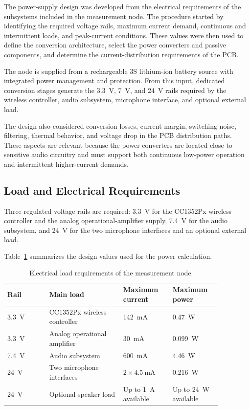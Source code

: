The power-supply design was developed from the electrical requirements of the subsystems included in the measurement node. The procedure started by identifying the required voltage rails, maximum current demand, continuous and intermittent loads, and peak-current conditions. These values were then used to define the conversion architecture, select the power converters and passive components, and determine the current-distribution requirements of the PCB.

The node is supplied from a rechargeable 3S lithium-ion battery source with integrated power management and protection. From this input, dedicated conversion stages generate the 3.3~V, 7~V, and 24~V rails required by the wireless controller, audio subsystem, microphone interface, and optional external load.

The design also considered conversion losses, current margin, switching noise, filtering, thermal behavior, and voltage drop in the PCB distribution paths. These aspects are relevant because the power converters are located close to sensitive audio circuitry and must support both continuous low-power operation and intermittent higher-current demands.


\subsection{Load and Electrical Requirements}

Three regulated voltage rails are required: 3.3~V for the CC1352Px wireless controller and the analog operational-amplifier supply, 7.4~V for the audio subsystem, and 24~V for the two microphone interfaces and an optional external load.

Table~\ref{tab:power_load_requirements} summarizes the design values used for the power calculation.

\begin{table}[h]
\centering
\caption{Electrical load requirements of the measurement node.}
\label{tab:power_load_requirements}
\begin{tabular}{|p{0.17\linewidth}|p{0.30\linewidth}|p{0.20\linewidth}|p{0.20\linewidth}|}
\hline
\textbf{Rail} & \textbf{Main load} & \textbf{Maximum current} & \textbf{Maximum power} \\
\hline
3.3~V & CC1352Px wireless controller & 142~mA & 0.47~W \\
\hline
3.3~V & Analog operational amplifier & 30~mA & 0.099~W \\
\hline
7.4~V & Audio subsystem & 600~mA & 4.46~W \\
\hline
24~V & Two microphone interfaces & $2\times4.5~\mathrm{mA}$ & 0.216~W \\
\hline
24~V & Optional speaker load & Up to 1~A available & Up to 24~W available \\
\hline
\end{tabular}
\end{table}

